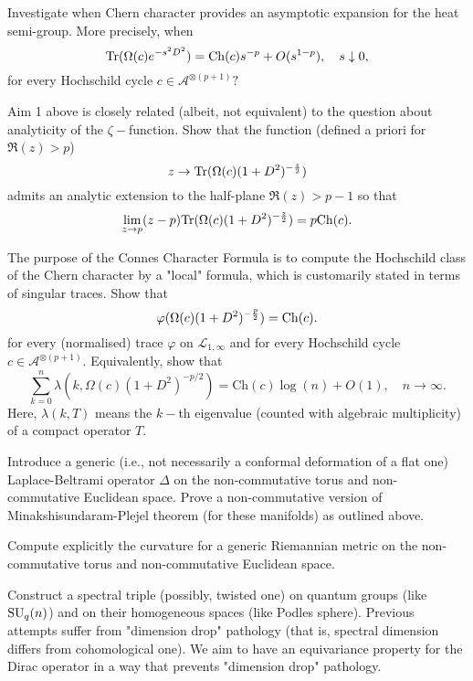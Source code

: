 \documentclass{article}
\begin{document}
 Investigate when Chern character provides an asymptotic expansion for the heat semi-group. More precisely, when 
\begin{equation}\label{heat eq}
{\rm Tr}(\Omega(c)e^{-s^2D^2})={\rm Ch}(c)s^{-p}+O(s^{1-p}),\quad s\downarrow0,
\end{equation}
for every Hochschild cycle $c\in\mathcal{A}^{\otimes (p+1)}?$ 

 Aim 1 above is closely related (albeit, not equivalent) to the question about analyticity of the $\zeta-$function. Show that the function (defined a priori for $\Re(z)>p$)
$$z\to {\rm Tr}(\Omega(c)(1+D^2)^{-\frac{z}{2}})$$
admits an analytic extension to the half-plane $\Re(z)>p-1$ so that
$$\lim_{z\to p}(z-p){\rm Tr}(\Omega(c)(1+D^2)^{-\frac{z}{2}})=p{\rm Ch}(c).$$


 The purpose of the Connes Character Formula is to compute the Hochschild class of the Chern character by a "local" formula, which is customarily  stated in terms of singular traces. Show that
\begin{equation}\label{super main eq}
\varphi(\Omega(c)(1+D^2)^{-\frac{p}{2}})={\rm Ch}(c).
\end{equation}
for every (normalised) trace $\varphi$ on $\mathcal{L}_{1,\infty}$ and for every Hochschild cycle $c\in\mathcal{A}^{\otimes (p+1)}.$ Equivalently, show that
$$\sum_{k=0}^n \lambda(k,\Omega(c)(1+D^2)^{-p/2}) = \mathrm{Ch}(c)\log(n)+O(1),\quad n\to\infty.$$
Here, $\lambda(k,T)$ means the $k-$th eigenvalue (counted with algebraic multiplicity) of a compact operator $T.$

 Introduce a generic (i.e., not necessarily a conformal deformation of a flat one) Laplace-Beltrami operator $\Delta$ on the non-commutative torus and non-commutative Euclidean space. Prove a non-commutative version of Minakshisundaram-Plejel theorem (for these manifolds) as outlined above.

 Compute explicitly the curvature for a generic Riemannian metric on the non-commutative torus and non-commutative Euclidean space.

 Construct a spectral triple (possibly, twisted one) on quantum groups (like ${\rm SU}_q(n)$) and on their homogeneous spaces (like Podles sphere). Previous attempts \cite{ChakrabortyPal} suffer from "dimension drop" pathology (that is, spectral dimension differs from cohomological one). We aim to have an equivariance property for the Dirac operator in a way that prevents "dimension drop" pathology. 
\end{document}
